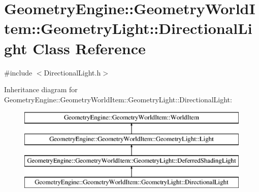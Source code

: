 \hypertarget{class_geometry_engine_1_1_geometry_world_item_1_1_geometry_light_1_1_directional_light}{}\section{Geometry\+Engine\+::Geometry\+World\+Item\+::Geometry\+Light\+::Directional\+Light Class Reference}
\label{class_geometry_engine_1_1_geometry_world_item_1_1_geometry_light_1_1_directional_light}


{\ttfamily \#include $<$Directional\+Light.\+h$>$}

Inheritance diagram for Geometry\+Engine\+::Geometry\+World\+Item\+::Geometry\+Light\+::Directional\+Light\+:\begin{figure}[H]
\begin{center}
\leavevmode
\includegraphics[height=4.000000cm]{class_geometry_engine_1_1_geometry_world_item_1_1_geometry_light_1_1_directional_light}
\end{center}
\end{figure}
